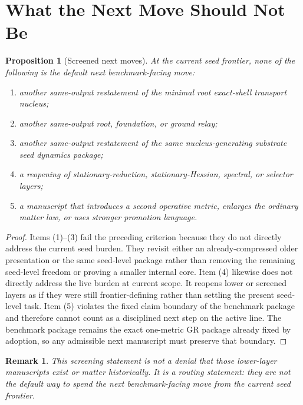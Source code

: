\documentclass[11pt]{article}
\newtheorem{proposition}{Proposition}
\newtheorem{remark}{Remark}
\begin{document}
\section{What the Next Move Should Not Be}

\begin{proposition}[Screened next moves]
At the current seed frontier, none of the following is the default next benchmark-facing move:
\begin{enumerate}
    \item another same-output restatement of the minimal root exact-shell transport nucleus;
    \item another same-output root, foundation, or ground relay;
    \item another same-output restatement of the same nucleus-generating substrate seed dynamics package;
    \item a reopening of stationary-reduction, stationary-Hessian, spectral, or selector layers;
    \item a manuscript that introduces a second operative metric, enlarges the ordinary matter law, or uses stronger promotion language.
\end{enumerate}
\end{proposition}

\begin{proof}
Items (1)--(3) fail the preceding criterion because they do not directly address the current seed burden. They revisit either an already-compressed older presentation or the same seed-level package rather than removing the remaining seed-level freedom or proving a smaller internal core. Item (4) likewise does not directly address the live burden at current scope. It reopens lower or screened layers as if they were still frontier-defining rather than settling the present seed-level task. Item (5) violates the fixed claim boundary of the benchmark package and therefore cannot count as a disciplined next step on the active line. The benchmark package remains the exact one-metric GR package already fixed by adoption, so any admissible next manuscript must preserve that boundary.
\end{proof}

\begin{remark}
This screening statement is not a denial that those lower-layer manuscripts exist or matter historically. It is a routing statement: they are not the default way to spend the next benchmark-facing move from the current seed frontier.
\end{remark}
\end{document}
